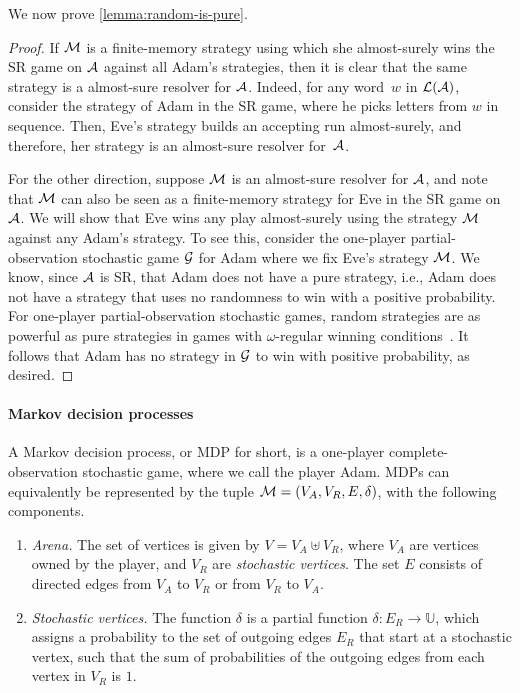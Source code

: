 We now prove \cref{lemma:random-is-pure}. 
\randomispure*
\begin{proof}
    If $\mathcal{M}$ is a finite-memory strategy using which she almost-surely wins the SR game on $\mathcal{A}$ against all Adam's strategies, then it is clear that the same strategy is a almost-sure resolver for $\mathcal{A}$. Indeed, for any word~$w$ in $\mathcal{L}(\mathcal{A})$, consider the strategy of Adam in the SR game, where he picks letters from $w$ in sequence. Then, Eve's strategy builds an accepting run almost-surely, and therefore, her strategy is an almost-sure resolver for~$\mathcal{A}$.

    For the other direction, suppose $\mathcal{M}$ is an almost-sure resolver for $\mathcal{A}$, and note that $\mathcal{M}$ can also be seen as a finite-memory strategy for Eve in the SR game on $\mathcal{A}$. We will show that Eve wins any play almost-surely using the strategy $\mathcal{M}$ against any Adam's strategy. To see this, consider the one-player partial-observation stochastic game $\mathcal{G}$ for Adam where we fix Eve's strategy $\mathcal{M}$. We know, since $\mathcal{A}$ is SR, that Adam does not have a pure strategy, i.e., Adam does not have a strategy that uses no randomness to win with a positive probability. For one-player partial-observation stochastic games, random strategies are as powerful as pure strategies in games with $\omega$-regular winning conditions~\cite[Theorem 7]{CDGH15}. It follows that Adam has no strategy in $\mathcal{G}$ to win with positive probability, as desired.  
\end{proof}


\paragraph*{Markov decision processes} A Markov decision process, or MDP for short, is a one-player complete-observation stochastic game, where we call the player Adam. MDPs can equivalently be represented by the tuple $\mathcal{M} = (V_A, V_R, E, \delta)$, with the following components.
\begin{enumerate}
    \item \emph{Arena.} The set of vertices is given by $V = V_A \uplus V_R$, where $V_A$ are vertices owned by the player, and $V_R$ are \emph{stochastic vertices}. The set $E$ consists of directed edges from $V_A$ to $V_R$ or from $V_R$ to $V_A$.
    \item \emph{Stochastic vertices.} The function $\delta$ is a partial function $\delta: E_R \xrightarrow{} \mathbb{U}$, which assigns a probability to the set of outgoing edges $E_R$ that start at a stochastic vertex, such that the sum of probabilities of the outgoing edges from each vertex in $V_R$ is $1$. 
\end{enumerate}

